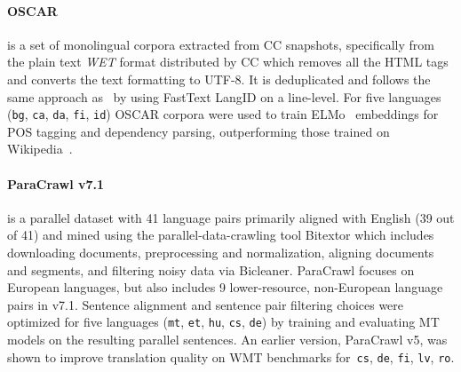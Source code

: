 \paragraph{OSCAR~\citep{ortiz-suarez-etal-2019-asynchronous, ortiz-suarez-etal-2020-monolingual}}is a set of monolingual corpora extracted from CC snapshots, specifically from the plain text \emph{WET} format distributed by CC which removes all the HTML tags and converts the text formatting to UTF-8. It is deduplicated and follows the same approach as~\citet{grave-etal-2018-learning} by using FastText LangID
on a line-level.
For five languages (\texttt{bg}, \texttt{ca}, \texttt{da}, \texttt{fi}, \texttt{id}) OSCAR corpora were used to train ELMo~\citep{peters-etal-2018-deep} embeddings for POS tagging and dependency parsing, outperforming those trained on Wikipedia~\citep{ortiz-suarez-etal-2020-monolingual}. %


\paragraph{ParaCrawl v7.1} is a parallel dataset with 41 language pairs primarily aligned with English (39 out of 41) and mined using the parallel-data-crawling tool Bitextor \citep{espla-etal-2019-paracrawl,banon-etal-2020-paracrawl} which includes downloading documents, preprocessing and normalization, aligning documents and segments, and filtering noisy data via Bicleaner.
ParaCrawl focuses on European languages, but also includes 9 lower-resource, non-European language pairs in v7.1.
Sentence alignment and sentence pair filtering choices were optimized for five languages (\texttt{mt}, \texttt{et}, \texttt{hu}, \texttt{cs}, \texttt{de}) by training and evaluating MT models on the resulting parallel sentences. An earlier version, ParaCrawl v5, was shown to improve translation quality on WMT benchmarks for~\texttt{cs}, \texttt{de}, \texttt{fi}, \texttt{lv}, \texttt{ro}.


